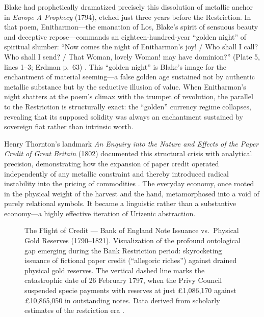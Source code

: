 \documentclass[
]{article}
\makeatletter
\newcommand*\pandocbounded[1]{%
  \sbox\pandoc@box{#1}%
  \Gscale@div\@tempa{\textheight}{\dimexpr\ht\pandoc@box+\dp\pandoc@box\relax}%
  \Gscale@div\@tempb{\linewidth}{\wd\pandoc@box}%
  \ifdim\@tempb\p@<\@tempa\p@\let\@tempa\@tempb\fi%
  \ifdim\@tempa\p@<\p@\scalebox{\@tempa}{\usebox\pandoc@box}%
  \else\usebox{\pandoc@box}%
  \fi%
}
\makeatother
\begin{document}
Blake had prophetically dramatized precisely this dissolution of
metallic anchor in \emph{Europe A Prophecy} (1794), etched just three
years before the Restriction. In that poem, Enitharmon---the emanation
of Los, Blake's spirit of sensuous beauty and deceptive
repose---commands an eighteen-hundred-year ``golden night'' of spiritual
slumber: ``Now comes the night of Enitharmon's joy! / Who shall I call?
Who shall I send? / That Woman, lovely Woman! may have dominion?''
(Plate 5, lines 1--3; Erdman p.~63) \citep{erdman1988complete}. This
``golden night'' is Blake's image for the enchantment of material
seeming---a false golden age sustained not by authentic metallic
substance but by the seductive illusion of value. When Enitharmon's
night shatters at the poem's climax with the trumpet of revolution, the
parallel to the Restriction is structurally exact: the ``golden''
currency regime collapses, revealing that its supposed solidity was
always an enchantment sustained by sovereign fiat rather than intrinsic
worth.

Henry Thornton's landmark \emph{An Enquiry into the Nature and Effects
of the Paper Credit of Great Britain} (1802) documented this structural
crisis with analytical precision, demonstrating how the expansion of
paper credit operated independently of any metallic constraint and
thereby introduced radical instability into the pricing of commodities
\citep{thornton1802nature}. The everyday economy, once rooted in the
physical weight of the harvest and the hand, metamorphosed into a void
of purely relational symbols. It became a linguistic rather than a
substantive economy---a highly effective iteration of Urizenic
abstraction.

\begin{figure}
\centering
\pandocbounded{\includegraphics[keepaspectratio,alt={The Flight of Credit --- Bank of England Note Issuance vs.~Physical Gold Reserves (1790--1821). Visualization of the profound ontological gap emerging during the Bank Restriction period: skyrocketing issuance of fictional paper credit (``allegoric riches'') against drained physical gold reserves. The vertical dashed line marks the catastrophic date of 26 February 1797, when the Privy Council suspended specie payments with reserves at just £1,086,170 against £10,865,050 in outstanding notes. Data derived from scholarly estimates of the restriction era {[}@clapham1944bank; @tooke1838history{]}.}]{../figures/historic_reserves.png}}
\caption{The Flight of Credit --- Bank of England Note Issuance
vs.~Physical Gold Reserves (1790--1821). Visualization of the profound
ontological gap emerging during the Bank Restriction period:
skyrocketing issuance of fictional paper credit (``allegoric riches'')
against drained physical gold reserves. The vertical dashed line marks
the catastrophic date of 26 February 1797, when the Privy Council
suspended specie payments with reserves at just £1,086,170 against
£10,865,050 in outstanding notes. Data derived from scholarly estimates
of the restriction era
\citep{clapham1944bank, tooke1838history}.}\label{fig-historic-reserves}
\end{figure}
\end{document}
